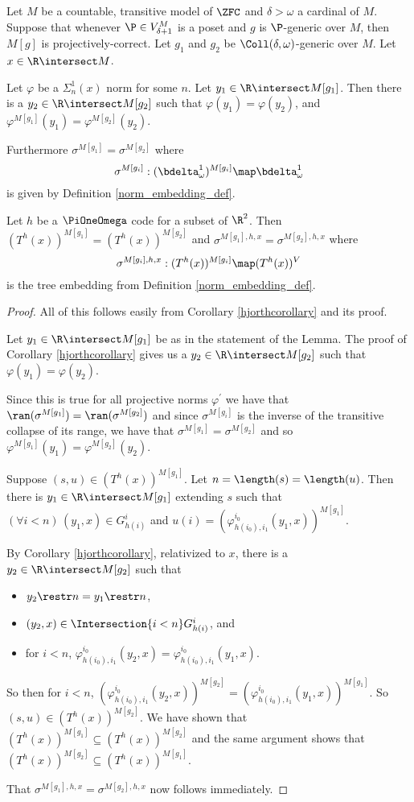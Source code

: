 \documentclass[oneside,12pt]{amsart}
\begin{document}
\begin{lemma}
\label{applyhjorthcorollary}
Let $M$ be a countable, transitive model of $\ZFC$ and  $\delta>\omega$ a cardinal of $M$.
Suppose that whenever $\P\in V^M_{\delta+1}$ is a poset and $g$ is $\P$-generic over $M$, then
$M[g]$ is projectively-correct. Let $g_1$ and $g_2$ be $\Coll(\delta,\omega)$-generic over $M$.
Let $x\in\R\intersect M$.

Let $\varphi$ be a $\Sigma^1_n(x)$ norm for some $n$.
Let $y_1\in\R\intersect M[g_1]$. Then there is a $y_2\in\R\intersect M[g_2]$ such
that $\varphi(y_1)=\varphi(y_2)$, and $\varphi^{M[g_1]}(y_1)=\varphi^{M[g_2]}(y_2)$.

Furthermore $\sigma^{M[g_1]} =\sigma^{M[g_2]}$ where
$$\sigma^{M[g_i]}:(\bdelta^1_{\omega})^{M[g_i]}\map \bdelta^1_{\omega}$$
is given by Definition \ref{norm_embedding_def}.

Let $h$ be a $\PiOneOmega$ code for a subset
of $\R^2$. Then $(T^h(x))^{M[g_1]}=(T^h(x))^{M[g_2]}$
and $\sigma^{M[g_1],h,x} = \sigma^{M[g_2],h,x}$ where
$$\sigma^{M[g_i],h,x}:(T^h(x))^{M[g_i]}\map(T^h(x))^V$$
is the tree embedding from
Definition \ref{norm_embedding_def}.
\end{lemma}
\begin{proof}
All of this follows easily from Corollary \ref{hjorthcorollary} and its proof.

Let $y_1\in\R\intersect M[g_1]$ be as in the statement of the Lemma. The proof of
Corollary \ref{hjorthcorollary} gives us a
$y_2\in\R\intersect M[g_2]$ such that $\varphi(y_1)=\varphi(y_2)$.

Since this is true for all projective norms $\varphi^{\prime}$
we have that
$\ran(\sigma^{M[g_1]})= \ran(\sigma^{M[g_2]})$
and since $\sigma^{M[g_i]}$ is the inverse of the transitive collapse of its range, we have that
$\sigma^{M[g_1]}=\sigma^{M[g_2]}$ and so $\varphi^{M[g_1]}(y_1)=\varphi^{M[g_2]}(y_2)$.


Suppose $(s,u)\in (T^h(x))^{M[g_1]}$. Let $n=\length(s)=\length(u)$. Then there is
$y_1\in\R\intersect M[g_1]$ extending $s$ such that $(\forall i<n)\, (y_1,x)\in G^{i}_{h(i)}$ and
$u(i)=(\varphi^{i_0}_{h(i_0),i_1}(y_1,x))^{M[g_1]}$.

By Corollary \ref{hjorthcorollary}, relativized to $x$, there is a $y_2\in\R\intersect M[g_2]$ such that
\begin{itemize}
\item $y_2 \restr n = y_1 \restr n$,
\item $(y_2,x)\in \Intersection{i<n} G^i_{h(i)}$, and
\item for $i<n$, $\varphi^{i_0}_{h(i_0),i_1}(y_2,x) = \varphi^{i_0}_{h(i_0),i_1}(y_1,x)$.
\end{itemize}

So then for $i<n$, $(\varphi^{i_0}_{h(i_0),i_1}(y_2,x))^{M[g_2]} =
(\varphi^{i_0}_{h(i_0),i_1}(y_1,x))^{M[g_1]}$.
So $(s,u)\in (T^h(x))^{M[g_2]}$. We have shown that $(T^h(x))^{M[g_1]}\subseteq(T^h(x))^{M[g_2]}$
and the same argument shows that
$(T^h(x))^{M[g_2]}\subseteq(T^h(x))^{M[g_1]}$.

That $\sigma^{M[g_1],h,x} = \sigma^{M[g_2],h,x}$ now follows immediately.
\end{proof}
\end{document}
